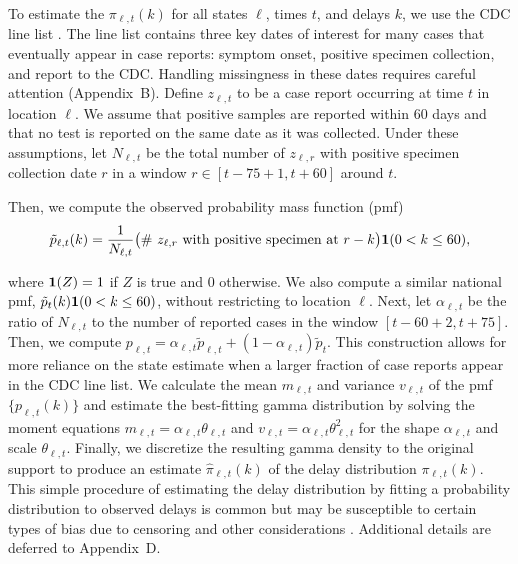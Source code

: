 

\begin{linenomath*} 
To estimate the $\pi_{\ell,t}(k)$ for all states $\ell$, times $t$, and delays
$k$, we use the CDC line list \citep{cdc2020caserestr}. The line list contains
three key dates of interest for many cases that eventually appear in case
reports: symptom onset, positive specimen collection, and report to the CDC.
Handling missingness in these dates requires careful attention (Appendix~B).
Define $z_{\ell,t}$ to be a case report occurring at time $t$ in location
$\ell$. We assume that positive samples are reported within 60 days and that no
test is reported on the same date as it was collected. Under these assumptions,
let $N_{\ell,t}$ be the total number of $z_{\ell,r}$ with positive specimen
collection date $r$ in a window $r \in [t-75+1, t+60]$ around $t$. 
\end{linenomath*} 
\begin{linenomath*} 
Then, we compute the observed probability mass function (pmf)
\begin{align}
  \tilde{p}_{\ell,t}(k) = \frac{1}{N_{\ell,t}} \big(\textrm{\# $z_{\ell,r}$
  with positive specimen at $r-k$}\big)\mathbf{1}(0<k\leq 60),
  \label{eq:line-list-delay}
\end{align}
\end{linenomath*} 
where $\mathbf{1}(Z) = 1$ if $Z$ is true and 0 otherwise. We also compute a
similar national pmf, $\tilde{p}_{t}(k)\mathbf{1}(0<k\leq 60)$, without
restricting to location $\ell$. Next, let $\alpha_{\ell,t}$ be the ratio of
$N_{\ell,t}$ to the number of reported cases in the window $[t-60+2, t+75]$.
Then, we compute $p_{\ell,t} = \alpha_{\ell,t}\tilde{p}_{\ell,t} +
(1-\alpha_{\ell,t})\tilde{p}_t$. This construction allows for more
reliance on the state estimate when a larger fraction of case reports
appear in the CDC line list. We calculate the mean $m_{\ell,t}$ and variance
$v_{\ell,t}$ of the pmf $\{p_{\ell,t}(k)\}$ and estimate the best-fitting gamma
distribution by solving the moment equations $m_{\ell,t} =
\alpha_{\ell,t}\theta_{\ell,t}$ and $v_{\ell,t}=
\alpha_{\ell,t}\theta_{\ell,t}^2$ for the shape $\alpha_{\ell,t}$ and scale
$\theta_{\ell,t}$. Finally, we discretize the resulting gamma density to the
original support to produce an estimate $\widehat{\pi}_{\ell,t}(k)$ of the delay
distribution $\pi_{\ell,t}(k)$. This simple procedure of estimating the delay
distribution by fitting a probability distribution to observed delays is 
common but may be susceptible to certain types of bias due to censoring and
other considerations \citep{park2024estimating}. 
Additional details are deferred to Appendix~D.
 

